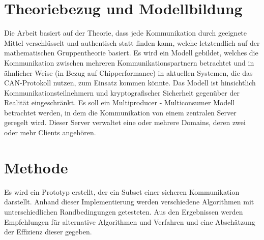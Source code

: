 \section{Theoriebezug und Modellbildung}
Die Arbeit basiert auf der Theorie, dass jede Kommunikation durch geeignete Mittel verschlüsselt und authentisch statt finden kann, welche letztendlich auf der mathematischen Gruppentheorie basiert. 
Es wird ein Modell gebildet, welches die Kommunikation zwischen mehreren Kommunikationspartnern betrachtet und in ähnlicher Weise (in Bezug auf Chipperformance) in aktuellen Systemen, die das CAN-Protokoll nutzen, zum Einsatz kommen könnte. Das Modell ist hinsichtlich Kommunikationsteilnehmern und kryptografischer Sicherheit gegenüber der Realität eingeschränkt.
Es soll ein Multiproducer - Multiconsumer Modell betrachtet werden, in dem die Kommunikation von einem zentralen Server geregelt wird. 
Dieser Server verwaltet eine oder mehrere Domains, deren zwei oder mehr Clients angehören. 





\section{Methode}
Es wird ein Prototyp erstellt, der ein Subset einer sicheren Kommunikation darstellt. Anhand dieser Implementierung werden verschiedene Algorithmen mit unterschiedlichen Randbedingungen getesteten. Aus den Ergebnissen werden Empfehlungen für alternative Algorithmen und Verfahren und eine Abschätzung der Effizienz dieser gegeben. 

